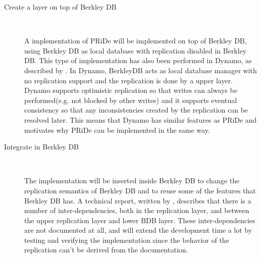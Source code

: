 \begin{description}
 
\item[Create a layer on top of Berkley DB] \
	
A implementation of PRiDe will be implemented on top of Berkley DB, using Berkley DB as local database with replication disabled in Berkley DB. This type of implementation has also been performed in Dynamo, as described by \cite{Dynamo2007}. In Dynamo, BerkleyDB acts as local database manager with no replication support and the replication is done by a upper layer. Dynamo supports optimistic replication so that writes can always be performed(e.g. not blocked by other writes) and it supports eventual consistency so that any inconsistencies created by the replication can be resolved later. This means that Dynamo has similar features as PRiDe and motivates why PRiDe can be implemented in the same way.  
	
\item[Integrate in Berkley DB] \

The implementation will be inserted inside Berkley DB to change the replication semantics of Berkley DB and to reuse some of the features that Berkley DB has. A technical report, written by \cite{kang2008}, describes that there is a number of inter-dependencies, both in the replication layer, and between the upper replication layer and lower BDB layer. These inter-dependencies are not documented at all, and will extend the development time a lot by testing and verifying the implementation since the behavior of the replication can't be derived from the documentation.
    	
\end{description} 



